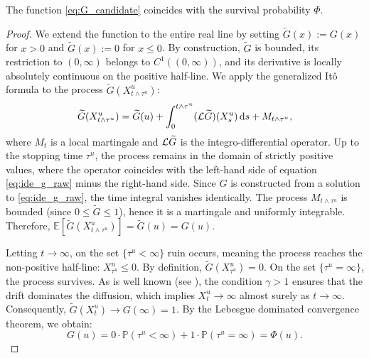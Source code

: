 \documentclass[smallextended]{svjour3}
\providecommand{\diff}{\mathop{}\!\mathrm{d}}
\newcommand\cL{{\cal L}}
\begin{document}
\begin{proposition}%
The function \eqref{eq:G_candidate} coincides with the survival probability $\Phi$.
\end{proposition}
\begin{proof}
We extend the function to the entire real line by setting $\widetilde G(x) := G(x)$ for $x > 0$ and $\widetilde G(x) := 0$ for $x \le 0$. By construction, $\widetilde G$ is bounded, its restriction to $(0,\infty)$ belongs to $C^1((0,\infty))$, and its derivative is locally absolutely continuous on the positive half-line. We apply the generalized Itô formula to the process $\widetilde G(X_{t\wedge\tau^u}^u)$:
\begin{equation*}
\widetilde G(X_{t\wedge\tau^u}^u) = \widetilde G(u) + \int_0^{t\wedge\tau^u} (\cL \widetilde G)(X_s^u) \diff s + M_{t\wedge\tau^u},
\end{equation*}
where $M_t$ is a local martingale and $\cL \widetilde G$ is the integro-differential operator. Up to the stopping time $\tau^u$, the process remains in the domain of strictly positive values, where the operator coincides with the left-hand side of equation \eqref{eq:ide_g_raw} minus the right-hand side. Since $G$ is constructed from a solution to \eqref{eq:ide_g_raw}, the time integral vanishes identically. The process $M_{t\wedge\tau^u}$ is bounded (since $0 \le \widetilde G \le 1$), hence it is a martingale and uniformly integrable. Therefore, $\mathbb{E}[\widetilde G(X_{t\wedge\tau^u}^u)] = \widetilde G(u) = G(u)$.

Letting $t\to\infty$, on the set $\{\tau^u<\infty\}$ ruin occurs, meaning the process reaches the non-positive half-line: $X_{\tau^u}^u \le 0$. By definition, $\widetilde G(X_{\tau^u}^u)=0$. On the set $\{\tau^u=\infty\}$, the process survives. As is well known (see \cite[Theorem 3.1]{Paulsen1993}), the condition $\gamma>1$ ensures that the drift dominates the diffusion, which implies $X_t^u \to \infty$ almost surely as $t\to\infty$. Consequently, $\widetilde G(X_t^u) \to G(\infty)=1$. By the Lebesgue dominated convergence theorem, we obtain:
\begin{equation*}
G(u) = 0 \cdot \mathbb{P}(\tau^u<\infty) + 1 \cdot \mathbb{P}(\tau^u=\infty) = \Phi(u).
\end{equation*}
\end{proof}
\end{document}
